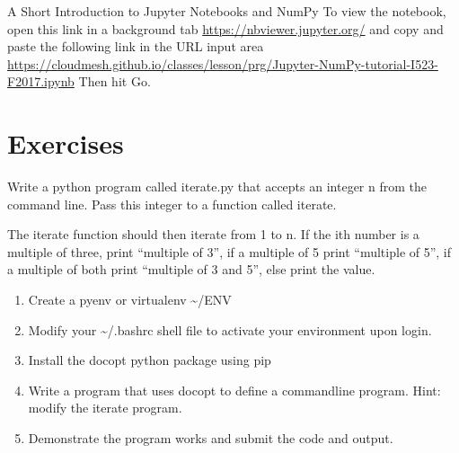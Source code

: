 A Short Introduction to Jupyter Notebooks and NumPy To view the
notebook, open this link in a background tab
\url{https://nbviewer.jupyter.org/} and copy and paste the following
link in the URL input area
\url{https://cloudmesh.github.io/classes/lesson/prg/Jupyter-NumPy-tutorial-I523-F2017.ipynb}
Then hit Go.


\section{Exercises}\label{exercises}

\begin{exercise}\label{E:Python.1}
Write a python program called iterate.py that accepts an integer n from
the command line. Pass this integer to a function called iterate.

The iterate function should then iterate from 1 to n. If the ith number
is a multiple of three, print ``multiple of 3'', if a multiple of 5
print ``multiple of 5'', if a multiple of both print ``multiple of 3 and
5'', else print the value.
\end{exercise}

\begin{exercise}\label{E:Python.2}
  \begin{enumerate}
  \item
    Create a pyenv or virtualenv \textasciitilde{}/ENV
  \item
    Modify your \textasciitilde{}/.bashrc shell file to activate your
    environment upon login.
  \item
    Install the docopt python package using pip
  \item
    Write a program that uses docopt to define a commandline program.
    Hint: modify the iterate program.
  \item
    Demonstrate the program works and submit the code and output.
  \end{enumerate}
\end{exercise}


